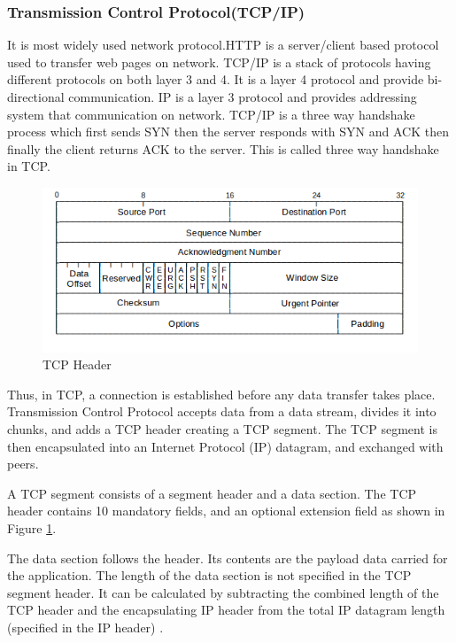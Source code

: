 \documentclass[12pt]{article}
\theoremstyle{definition}
\begin{document}
			\subsubsection{Transmission Control Protocol(TCP/IP)}
			It  is  most  widely  used network  protocol.HTTP  is  a  server/client  based  protocol used to transfer web pages on network.
			TCP/IP is a stack of protocols having different protocols on both layer 3 and 4. It   is   a   layer 4 protocol and provide bi-directional communication. IP is a layer 3 protocol  and  provides addressing system that communication on  network. TCP/IP is a three way handshake process which first sends SYN then the server responds with SYN and ACK then finally the client returns ACK to the server. This is called three way handshake in TCP.
			
			\begin{figure}[!h]
				\centering
				\includegraphics[width=400pt]{pictures/tcp_header.png}
				\caption{TCP Header}
				\label{fig:tcp-header}
			\end{figure}
			
			Thus, in TCP, a connection is established before any data transfer takes place. Transmission Control Protocol accepts data from a data stream, divides it into chunks, and adds a TCP header creating a TCP segment. The TCP segment is then encapsulated into an Internet Protocol (IP) datagram, and exchanged with peers\cite{Iqbal2016}.
			
			A TCP segment consists of a segment header and a data section. The TCP header contains 10 mandatory fields, and an optional extension field as shown in Figure \ref{fig:tcp-header}.
			
			The data section follows the header. Its contents are the payload data carried for the application. The length of the data section is not specified in the TCP segment header. It can be calculated by subtracting the combined length of the TCP header and the encapsulating IP header from the total IP datagram length (specified in the IP header) \cite{Peng2016}. 
			
\end{document}

